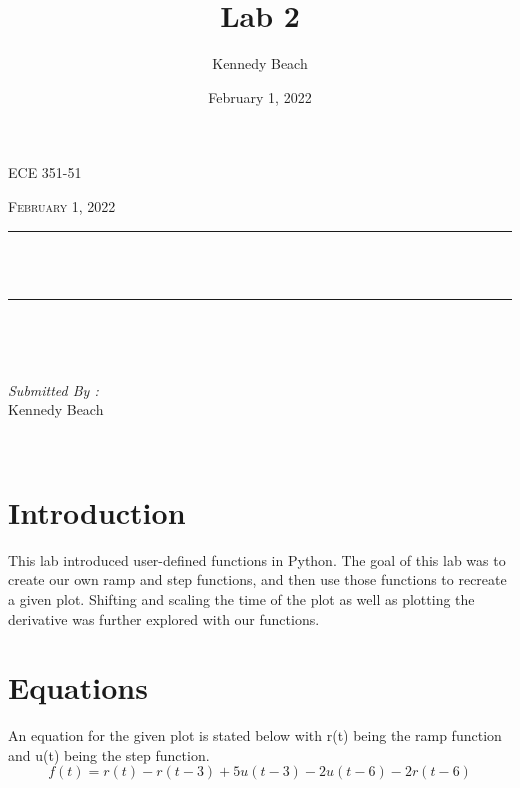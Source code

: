 \documentclass[12pt]{report}
\title{Lab 2}
\author{Kennedy Beach}
\date{February 1, 2022}
\makeatletter
\let\thetitle\@title
\makeatother
\begin{document}
\begin{titlepage}
\centering
\vspace*{0.5 cm}
\begin{center}    \textsc{\Large   ECE 351-51 }\\[2.0 cm]
\end{center}%
\textsc{\Large February 1, 2022}\\[0.5 cm] %
\rule{\linewidth}{0.2 mm} \\[0.4 cm]
{ \huge \bfseries \thetitle}\\
\rule{\linewidth}{0.2 mm} \\[1.5 cm]
\begin{minipage}{0.4\textwidth}
\begin{flushleft} \large
\end{flushleft}
\end{minipage}~
\begin{minipage}{0.4\textwidth}
\begin{flushright} \large
\emph{Submitted By :} \\
Kennedy Beach
\end{flushright}
\end{minipage}\\[2 cm]
\end{titlepage}
\tableofcontents
\pagebreak
\renewcommand{\thesection}{\arabic{section}}
\section{Introduction}
This lab introduced user-defined functions in Python. The goal of this lab was to create our own ramp and step functions,  and then use those functions to recreate a given plot. Shifting and scaling the time of the plot as well as plotting the derivative was further explored with our functions. 
\section{Equations}
An equation for the given plot is stated below with r(t) being the ramp function and u(t) being the step function.
\begin{equation*}
f(t) = r(t) - r(t-3) + 5u(t-3) - 2u(t-6) - 2r(t-6)
\end{equation*}
\end{document}
